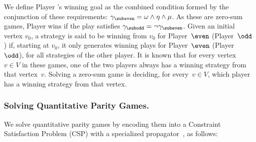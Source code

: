 \documentclass[a4paper,UKenglish,cleveref, autoref, thm-restate, anonymous]{lipics-v2021}
\begin{document}
We define Player \even's winning goal as the combined condition formed by the conjunction of these requirements:
$\gamma_{\subeven} = \omega \wedge \eta \wedge \mu$. As these are zero-sum games, Player \odd wins if the play satisfies $\gamma_{\subodd} = \neg \gamma_{\subeven}$.
%
Given an initial vertex $v_0$, a strategy is said to be winning from $v_0$ for Player~$\even$ (Player~$\odd$) if, starting at $v_0$, it only generates winning plays for Player~$\even$ (Player~$\odd$), for all strategies of the other player. It is known that for every vertex~$v\in V$ in these games, one of the two players always has a winning strategy from that vertex~$v$. Solving a zero-sum game is deciding, for every~$v\in V$, which player has a winning strategy from that vertex.


\subsubsection{Solving Quantitative Parity Games.}
We solve quantitative parity games by encoding them into a Constraint Satisfaction Problem (CSP) with a specialized propagator~\cite{Hernandez:2026:noc}, as follows: 
\end{document}
